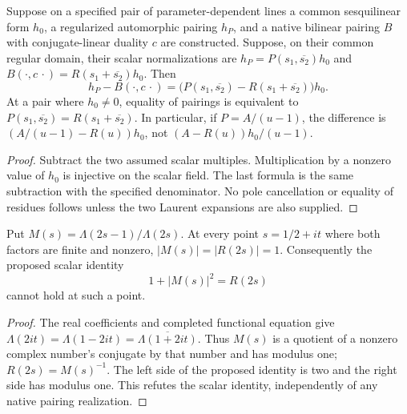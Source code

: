 \begin{theorem}
\label{v4-arith:kms-gns:thm:eisenstein-discrepancy}
Suppose on a specified pair of parameter-dependent lines a common
sesquilinear form \(h_0\), a regularized automorphic pairing \(h_P\), and
a native bilinear pairing \(B\) with conjugate-linear duality \(c\) are
constructed. Suppose, on their common regular domain, their scalar
normalizations are
\(h_P=P(s_1,\overline{s_2})h_0\) and
\(B(\cdot,c\,\cdot)=R(s_1+\overline{s_2})h_0\). Then
\begin{equation}
 h_P-B(\cdot,c\,\cdot)
 =\bigl(P(s_1,\overline{s_2})-R(s_1+\overline{s_2})\bigr)h_0.
 \label{v4-arith:kms-gns:eq:continuum-discrepancy}
\end{equation}
At a pair where \(h_0\ne0\), equality of pairings is equivalent to
\(P(s_1,\overline{s_2})=R(s_1+\overline{s_2})\).
In particular, if \(P=A/(u-1)\), the difference is
\((A/(u-1)-R(u))h_0\), not \((A-R(u))h_0/(u-1)\).
\end{theorem}
\begin{proof}
Subtract the two assumed scalar multiples. Multiplication by a
nonzero value of \(h_0\) is injective on the scalar field. The last
formula is the same subtraction with the specified denominator.
No pole cancellation or equality of residues follows unless the two
Laurent expansions are also supplied.
\end{proof}

\begin{proposition}
\label{v4-arith:kms-gns:rem:match-is-FE}
Put \(M(s)=\Lambda(2s-1)/\Lambda(2s)\). At every point
\(s=1/2+it\) where both factors are finite and nonzero,
\(\lvert M(s)\rvert=\lvert R(2s)\rvert=1\). Consequently the proposed
scalar identity
\begin{equation}
       1+|M(s)|^2=R(2s)
       \label{v4-arith:kms-gns:eq:continuum-match-condition}
\end{equation}
cannot hold at such a point.
\end{proposition}
\begin{proof}
The real coefficients and completed functional equation give
\(\Lambda(2it)=\Lambda(1-2it)=\overline{\Lambda(1+2it)}\).
Thus \(M(s)\) is a quotient of a nonzero complex number's conjugate by
that number and has modulus one; \(R(2s)=M(s)^{-1}\).
The left side of the proposed identity is two and the right side has
modulus one. This refutes the scalar identity, independently of any
native pairing realization.
\end{proof}

